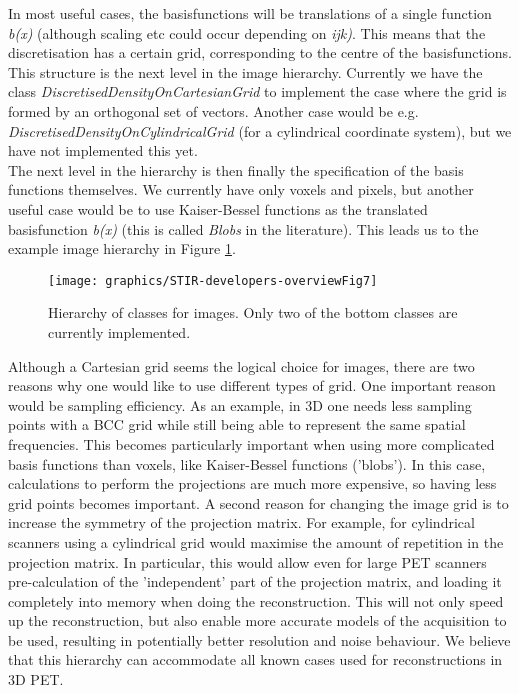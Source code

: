 \documentclass{article}
\begin{document}
In most useful cases, the basisfunctions will be translations 
of a single function \textit{b(x)} (although scaling etc could occur 
depending on \textit{ijk)}. This means that the discretisation has 
a certain grid, corresponding to the centre of the basisfunctions. 
This structure is the next level in the image hierarchy. Currently 
we have the class \textit{DiscretisedDensityOnCartesianGrid} to implement 
the case where the grid is formed by an orthogonal set of vectors. 
Another case would be e.g. \textit{DiscretisedDensityOnCylindricalGrid} 
(for a cylindrical coordinate system), but we have not implemented 
this yet.\\
The next level in the hierarchy is then finally the specification 
of the basis functions themselves. We currently have only voxels 
and pixels, but another useful case would be to use Kaiser-Bessel 
functions as the translated basisfunction \textit{b(x)} (this is called \textit{Blobs} 
in the literature). This leads us to the example image hierarchy 
in Figure \ref{image-hierarchy}.\\
\begin{figure}[htbp]
\begin{center}
\texttt{[image: graphics/STIR-developers-overviewFig7]}
\caption{ Hierarchy of classes for images. Only two 
of the bottom classes are currently implemented.}
\label{image-hierarchy}
\end{center}
\end{figure}


Although a Cartesian grid seems the logical choice for images, 
there are two reasons why one would like to use different types 
of grid. One important reason would be sampling efficiency. As 
an example, in 3D one needs less sampling points with a BCC grid 
while still being able to represent the same spatial frequencies. 
This becomes particularly important when using more complicated 
basis functions than voxels, like Kaiser-Bessel functions ('blobs'). 
In this case, calculations to perform the projections are much 
more expensive, so having less grid points becomes important. 
A second reason for changing the image grid is to increase the 
symmetry of the projection matrix. For example, for cylindrical 
scanners using a cylindrical grid would maximise the amount of 
repetition in the projection matrix. In particular, this would 
allow even for large PET scanners pre-calculation of the 'independent' 
part of the projection matrix, and loading it completely into 
memory when doing the reconstruction. This will not only speed 
up the reconstruction, but also enable more accurate models of 
the acquisition to be used, resulting in potentially better resolution 
and noise behaviour. We believe that this hierarchy can accommodate 
all known cases used for reconstructions in 3D PET.
\end{document}
